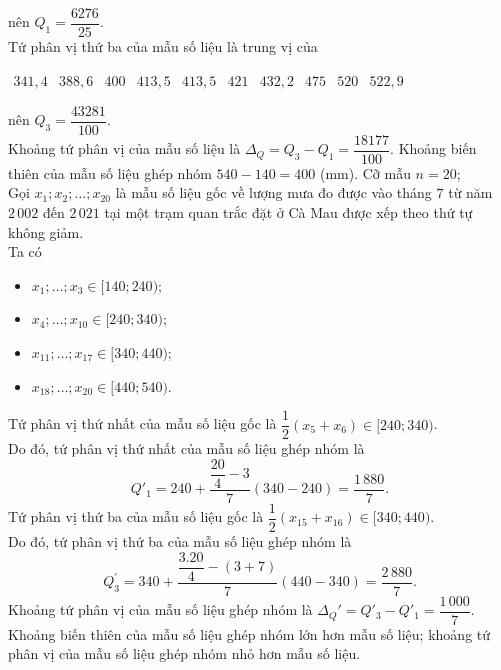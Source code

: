 \begin{ex}
{\begin{itemchoice}
	nên $Q_1=\dfrac{6276}{25}$.\\ 
	Tứ phân  vị thứ ba của mẫu số liệu là trung vị của
	\begin{center}
		$\begin{array}{cccccccccc}
		341{,}4 &388{,}6 &400 &413{,}5 &413{,}5 &421  &432{,}2 &475 &520 &522{,}9
	\end{array}$
	\end{center}
	 nên $Q_3=\dfrac{43281}{100}$.\\
	 Khoảng tứ phân vị của mẫu số liệu là $\Delta_Q=Q_3-Q_1=\dfrac{18177}{100}$.
	\itemch Khoảng biến thiên của mẫu số liệu ghép nhóm $540-140=400$  (mm).
	Cỡ mẫu  $n=20$;\\
	Gọi $x_1;x_2;\ldots;x_{20}$ là  mẫu số liệu gốc về lượng mưa đo được vào tháng $7$ từ năm $2\,002$ đến $2\,021$ tại một trạm quan trắc đặt ở Cà Mau được xếp theo thứ tự không giảm.\\
	 Ta có
	\begin{itemize}
		\item $x_1;\ldots;x_3  \in [140;240)$;
		\item $x_4;\ldots;x_{10} \in  [240;340)$;
		\item $x_{11};\ldots;x_{17} \in  [340;440)$;
		\item  $x_{18};\ldots;x_{20} \in [440;540)$.
	\end{itemize}
	Tứ phân vị thứ nhất của  mẫu số liệu gốc là $\dfrac{1}{2} \left(x_5+x_6 \right)\in [240;340)$.\\
	Do đó, tứ phân vị thứ nhất của mẫu số liệu ghép nhóm là \[Q'_1 =240+\dfrac{\dfrac{20}{4}-3}{7} (340-240)=\dfrac{1\,880}{7}.\] 
	Tứ phân vị thứ ba của mẫu  số liệu gốc là $\dfrac{1}{2} \left(x_{15}+x_{16} \right)\in [340;440)$. \\
	Do đó, tứ phân vị  thứ ba của mẫu số liệu ghép nhóm là \[Q_3 ^{{'}}=340+\dfrac{\dfrac{3.20}{4}-(3+7)}{7} (440-340)=\dfrac{2\,880}{7}.\]
	 \itemch Khoảng tứ phân vị của mẫu số liệu ghép nhóm là $\Delta_Q'=Q'_3-Q'_1=\dfrac{1\,000}{7}$.\\
	Khoảng biến thiên của mẫu số liệu ghép nhóm lớn  hơn mẫu số liệu; khoảng tứ phân vị của mẫu số liệu ghép nhóm nhỏ hơn mẫu số liệu.
	\end{itemchoice}
} 
\end{ex}

